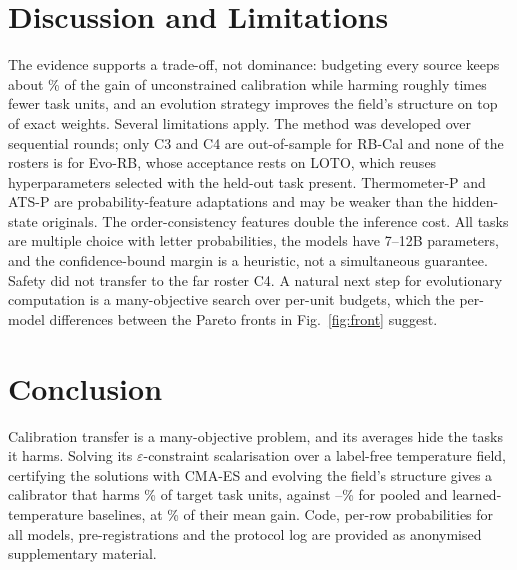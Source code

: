 \documentclass[runningheads]{llncs}
\begin{document}
\section{Discussion and Limitations}
The evidence supports a trade-off, not dominance: budgeting every source keeps about \RetainEvo\% of the gain of unconstrained calibration while harming roughly \HarmRatio{} times fewer task units, and an evolution strategy improves the field's structure on top of exact weights.
Several limitations apply.
The method was developed over sequential rounds; only C3 and C4 are out-of-sample for RB-Cal and none of the rosters is for Evo-RB, whose acceptance rests on LOTO, which reuses hyperparameters selected with the held-out task present.
Thermometer-P and ATS-P are probability-feature adaptations and may be weaker than the hidden-state originals.
The order-consistency features double the inference cost.
All tasks are multiple choice with letter probabilities, the models have 7--12B parameters, and the confidence-bound margin is a heuristic, not a simultaneous guarantee.
Safety did not transfer to the far roster C4.
A natural next step for evolutionary computation is a many-objective search over per-unit budgets, which the per-model differences between the Pareto fronts in Fig.~\ref{fig:front} suggest.

\section{Conclusion}
Calibration transfer is a many-objective problem, and its averages hide the tasks it harms.
Solving its $\varepsilon$-constraint scalarisation over a label-free temperature field, certifying the solutions with CMA-ES and evolving the field's structure gives a calibrator that harms \AggEvoHarmRate\% of \NTotal{} target task units, against \AggThermoHarmRate--\AggAtsHarmRate\% for pooled and learned-temperature baselines, at \RetainEvo\% of their mean gain.
Code, per-row probabilities for all models, pre-registrations and the protocol log are provided as anonymised supplementary material.



\end{document}
